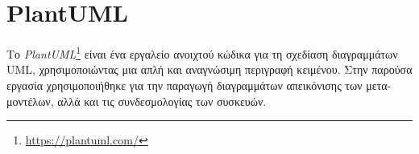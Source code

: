 \section{PlantUML}
\label{sec:plantuml}

Το \textit{PlantUML}\footnote{\url{https://plantuml.com/}} είναι ένα εργαλείο ανοιχτού κώδικα για τη σχεδίαση διαγραμμάτων UML, χρησιμοποιώντας μια απλή και αναγνώσιμη περιγραφή κειμένου. Στην παρούσα εργασία χρησιμοποιήθηκε για την παραγωγή διαγραμμάτων απεικόνισης των μετα-μοντέλων, αλλά και τις συνδεσμολογίας των συσκευών.